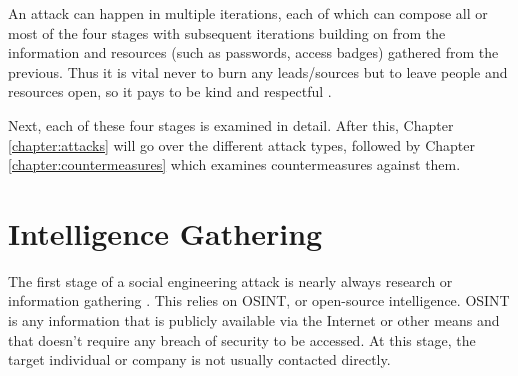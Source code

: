 An attack can happen in multiple iterations, each of which can compose all or most of the four stages with subsequent iterations building on from the information and resources (such as passwords, access badges) gathered from the previous. Thus it is vital never to burn any leads/sources but to leave people and resources open, so it pays to be kind and respectful \citep{hadnagySocialEngineering2018}.

Next, each of these four stages is examined in detail. After this, Chapter \ref{chapter:attacks} will go over the different attack types, followed by Chapter \ref{chapter:countermeasures} which examines countermeasures against them.






\section{Intelligence Gathering}
\begin{comment}
    
    - OSINT has been defined in a preceending chapter
    - Cover the phase of intel gathering more broadly than just OSINT
    - Following and observing people entering and exiting premises
    - Calling the company for more information (after OSINT)
    - Use of pretexting in intel gathering
    - Gather info, understand vulnerabilities, habits, potential entry/exit points
    - Company website, social media profiles (inlc. old), public info e.g. from corporate databases (YTJ)
    - Physical surveillance of targets
    - AI can augment data collection and analysis (inc big amounts of data), increases speed of intel gathering and the attack itself
    - NLP may help in parsing the info

\end{comment}


The first stage of a social engineering attack is nearly always research or information gathering \citep{krombholzAdvancedSocialEngineeringAttacks2015}. This relies on OSINT, or open-source intelligence. OSINT is any information that is publicly available via the Internet or other means and that doesn't require any breach of security to be accessed. At this stage, the target individual or company is not usually contacted directly.

